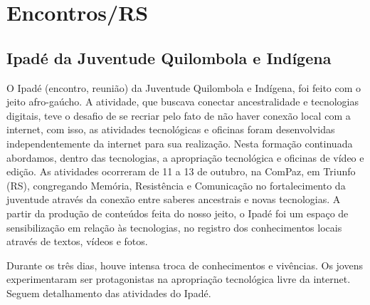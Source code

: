 \documentclass[a4paper, 11pt, oneside]{Relatorio_sem}  %
\begin{document}
\section{Encontros/RS}

\subsection{Ipadé da Juventude Quilombola e Indígena}
O Ipadé (encontro, reunião) da Juventude Quilombola e Indígena, foi
feito com o jeito afro-gaúcho. A atividade, que buscava conectar
ancestralidade e tecnologias digitais, teve o desafio de se recriar
pelo fato de não haver conexão local com a internet, com isso, as
atividades tecnológicas e oficinas foram desenvolvidas
independentemente da internet para sua realização. Nesta formação
continuada abordamos, dentro das tecnologias, a apropriação
tecnológica e oficinas de vídeo e edição. As atividades ocorreram de
11 a 13 de outubro, na ComPaz, em Triunfo (RS), congregando Memória,
Resistência e Comunicação no fortalecimento da juventude através da
conexão entre saberes ancestrais e novas tecnologias. A partir da
produção de conteúdos feita do nosso jeito, o Ipadé foi um espaço de
sensibilização em relação às tecnologias, no registro dos
conhecimentos locais através de textos, vídeos e fotos.

Durante os três dias, houve intensa troca de conhecimentos e
vivências. Os jovens experimentaram ser protagonistas na apropriação
tecnológica livre da internet. Seguem detalhamento das atividades do
Ipadé.
\end{document}
